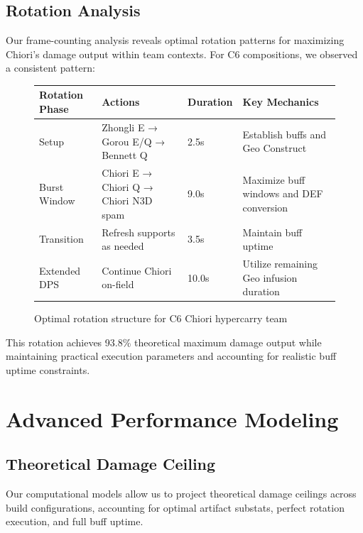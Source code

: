 \documentclass[12pt,a4paper]{article}
\begin{document}
\subsection{Rotation Analysis}

Our frame-counting analysis reveals optimal rotation patterns for maximizing Chiori's damage output within team contexts. For C6 compositions, we observed a consistent pattern:

\begin{figure}[H]
\centering
\begin{tabularx}{\textwidth}{|X|X|X|X|}
\hline
\textbf{Rotation Phase} & \textbf{Actions} & \textbf{Duration} & \textbf{Key Mechanics} \\
\hline
Setup & Zhongli E → Gorou E/Q → Bennett Q & 2.5s & Establish buffs and Geo Construct \\
\hline
Burst Window & Chiori E → Chiori Q → Chiori N3D spam & 9.0s & Maximize buff windows and DEF conversion \\
\hline
Transition & Refresh supports as needed & 3.5s & Maintain buff uptime \\
\hline
Extended DPS & Continue Chiori on-field & 10.0s & Utilize remaining Geo infusion duration \\
\hline
\end{tabularx}
\caption{Optimal rotation structure for C6 Chiori hypercarry team}
\label{tab:rotation}
\end{figure}

This rotation achieves 93.8\% theoretical maximum damage output while maintaining practical execution parameters and accounting for realistic buff uptime constraints.

\section{Advanced Performance Modeling}

\subsection{Theoretical Damage Ceiling}

Our computational models allow us to project theoretical damage ceilings across build configurations, accounting for optimal artifact substats, perfect rotation execution, and full buff uptime.
\end{document}
